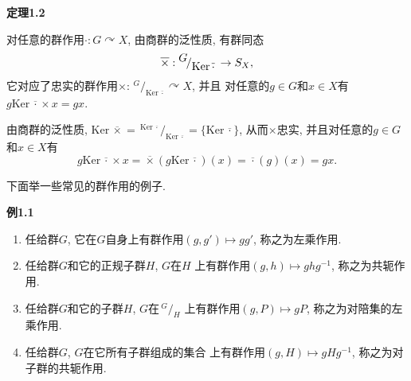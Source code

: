 \documentclass[UTF8]{ctexart}
\begin{document}
\hypertarget{sec:定理1.2}{}
\noindent\textbf{定理1.2}

对任意的群作用$\cdot:G\curvearrowright X$, 由商群的泛性质, 有群同态
\vspace{3pt}
\[
    \overline{\times}:\,\!^{\displaystyle G}\!
    /_{\displaystyle\mathrm{Ker}\,\overline{\cdot}}\,\to S_X,\\[3pt]
\]
它对应了忠实的群作用$\times:\,\!^{\displaystyle G}\!
/_{\displaystyle\mathrm{Ker}\,\overline{\cdot}}\curvearrowright X$, 并且
对任意的$g\in G$和$x\in X$有$g\mathrm{Ker}\,\overline{\cdot}\times x=gx$.

\vspace{3pt}

由商群的泛性质, $\mathrm{Ker}\,\overline{\times}=
\,\!^{\displaystyle\mathrm{Ker}\,\overline{\cdot}}\!/_
{\displaystyle\mathrm{Ker}\,\overline{\cdot}}=\{\mathrm{Ker}\,\overline{\cdot}\}$,
从而$\times$忠实, 并且对任意的$g\in G$和$x\in X$有
\vspace{5pt}
\begin{equation*}
    g\mathrm{Ker}\,\overline{\cdot}\times x=
    \overline{\times}(g\mathrm{Ker}\,\overline{\cdot})(x)=
    \overline{\cdot}(g)(x)=gx.
\tag*{\qedsymbol}\end{equation*}

\vspace{15pt}

下面举一些常见的群作用的例子.

\vspace{10pt}

\hypertarget{sec:例1.1}{}
\noindent\textbf{例1.1}

\begin{enumerate}
    \item 任给群$G$, 它在$G$自身上有群作用$(g,g')\mapsto gg'$, 称之为左乘作用.
    \item 任给群$G$和它的正规子群$H$, $G$在$H$
    上有群作用$(g,h)\mapsto ghg^{-1}$, 称之为共轭作用.
    \vspace{3pt}
    \item 任给群$G$和它的子群$H$, $G$在$\,\!^{\displaystyle G}\!/_{\displaystyle H}$
    上有群作用$(g,P)\mapsto gP$, 称之为对陪集的左乘作用.
    \vspace{3pt}
    \item 任给群$G$, $G$在它所有子群组成的集合
    上有群作用$(g,H)\mapsto gHg^{-1}$, 称之为对子群的共轭作用.
\end{enumerate}
\end{document}
